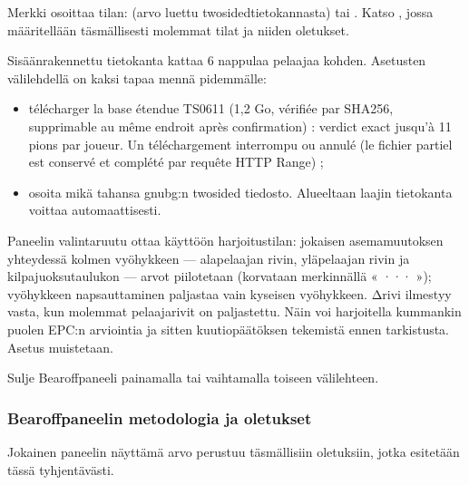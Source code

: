 \documentclass[letterpaper,10pt,finnish]{sphinxmanual}
\begin{document}
\sphinxAtStartPar
Merkki osoittaa tilan:  (arvo luettu two\sphinxhyphen{}sided\sphinxhyphen{}tietokannasta) tai . Katso {\hyperref[\detokenize{manuel:epc-methodologie}]{}}, jossa määritellään täsmällisesti molemmat tilat ja niiden oletukset.

\sphinxAtStartPar
{} Sisäänrakennettu tietokanta kattaa 6 nappulaa pelaajaa kohden. Asetusten \sphinxhyphen{}välilehdellä on kaksi tapaa mennä pidemmälle:
\begin{itemize}
\item {} 
\sphinxAtStartPar
télécharger la base étendue TS\sphinxhyphen{}06\sphinxhyphen{}11 (1,2 Go, vérifiée par SHA\sphinxhyphen{}256,
supprimable au même endroit après confirmation) : verdict exact jusqu’à
11 pions par joueur. Un téléchargement interrompu ou annulé  (le fichier partiel est conservé et complété par
requête HTTP Range) ;

\item {} 
\sphinxAtStartPar
osoita mikä tahansa gnubg:n two\sphinxhyphen{}sided \sphinxhyphen{}tiedosto. Alueeltaan laajin tietokanta voittaa automaattisesti.

\end{itemize}

\sphinxAtStartPar
{} Paneelin \sphinxhyphen{}valintaruutu ottaa käyttöön harjoitustilan: jokaisen asemamuutoksen yhteydessä kolmen vyöhykkeen — alapelaajan rivin, yläpelaajan rivin ja kilpajuoksutaulukon — arvot piilotetaan (korvataan merkinnällä « ··· »); vyöhykkeen napsauttaminen paljastaa vain kyseisen vyöhykkeen. Δ\sphinxhyphen{}rivi ilmestyy vasta, kun molemmat pelaajarivit on paljastettu. Näin voi harjoitella kummankin puolen EPC:n arviointia ja sitten kuutiopäätöksen tekemistä ennen tarkistusta. Asetus muistetaan.

\sphinxAtStartPar
Sulje Bearoff\sphinxhyphen{}paneeli painamalla  tai vaihtamalla toiseen välilehteen.


\subsubsection{Bearoff\sphinxhyphen{}paneelin metodologia ja oletukset}
\label{\detokenize{manuel:methodologie-et-hypotheses-du-panneau-bearoff}}\label{\detokenize{manuel:epc-methodologie}}
\sphinxAtStartPar
Jokainen paneelin näyttämä arvo perustuu täsmällisiin oletuksiin, jotka esitetään tässä tyhjentävästi.
\end{document}
